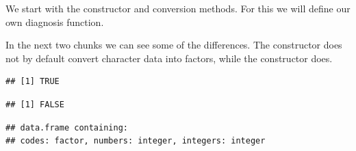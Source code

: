 \documentclass[krantz2]{krantz}\usepackage{knitr}%
\begin{document}
We start with the constructor and conversion methods. For this we will define our own diagnosis function.

\begin{knitrout}\footnotesize
{}\color{fgcolor}\begin{kframe}
\begin{alltt}
 \hlkwb{<-} \hlstd{(}\hlstd{) \{}
  \hlstd{(}
    \hlstd{(}\hlstd{(}\hlstd{(x)[}\hlstd{],}
    \hlstd{),}
    \hlstd{(}
            \hlstd{=} \hlstd{,}  \hlstd{=} \hlstd{),}
     \hlstd{=} \hlstd{)}
    \hlstd{)}
\hlstd{\}}
\end{alltt}
\end{kframe}
\end{knitrout}

In the next two chunks we can see some of the differences. The  constructor does not by default convert character data into factors, while the  constructor does.

\begin{knitrout}\footnotesize
{}\color{fgcolor}\begin{kframe}
\begin{alltt}
 \hlkwb{<-} \hlstd{(} \hlstd{=} \hlstd{(}\hlstd{,} \hlstd{,} \hlstd{),}  \hlstd{=} \hlopt{:}\hlstd{,}  \hlstd{=} \hlopt{:}\hlstd{)}
\end{alltt}
\begin{verbatim}
## [1] TRUE
\end{verbatim}
\begin{alltt}
\end{alltt}
\begin{verbatim}
## [1] FALSE
\end{verbatim}
\begin{alltt}
\end{alltt}
\begin{verbatim}
## data.frame containing:
## codes: factor, numbers: integer, integers: integer
\end{verbatim}
\end{kframe}
\end{knitrout}
\end{document}
